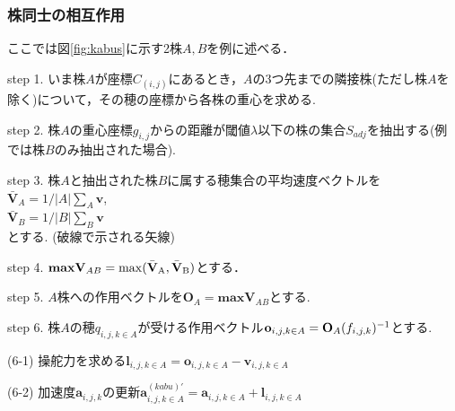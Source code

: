 \documentclass[twocolumn]{jarticle}
\begin{document}
    \subsubsection{株同士の相互作用}
    ここでは図\ref{fig:kabus}に示す2株$A,B$を例に述べる．
    \begin{description}
        \item{step 1.} いま株$A$が座標$C_(i,j)$にあるとき，$A$の3つ先までの隣接株(ただし株$A$を除く)について，その穂の座標から各株の重心を求める.
        \item{step 2.} 株$A$の重心座標$g_{i,j}$からの距離が閾値$\lambda$以下の株の集合$S_{adj}$を抽出する(例では株$B$のみ抽出された場合).
        \item{step 3.} 株$A$と抽出された株$B$に属する穂集合の平均速度ベクトルを\\
        $\displaystyle \bar{\mathbf{V}}_{A}=1/|A|{\sum_{A} \mathbf{v}}$,\\
        $\displaystyle \bar{\mathbf{V}}_{B}=1/|B|{\sum_{B} \mathbf{v}}$\\
        とする. (破線で示される矢線)
        \item{step 4.} $\displaystyle\mathbf{maxV}_{AB}=\rm{max}(\bar{\mathbf{V}}_{A},\bar{\mathbf{V}}_{B})$とする．
        \item{step 5.} $A$株への作用ベクトルを$\displaystyle\mathbf{O}_{A}=\mathbf{maxV}_{AB}$とする. 
        \item{step 6.} 株$A$の穂$q_{i,j,k \in A}$が受ける作用ベクトル$\mathbf{o}_{i,j,k \in A} \\
        =\mathbf{O}_{A}(f_{i,j,k})^{-1}$とする.
        \begin{description}
            \item{(6-1)} 操舵力を求める$\mathbf{l}_{i,j,k\in A}=\mathbf{o}_{i,j,k \in A}-\mathbf{v}_{i,j,k \in A}$
            \item{(6-2)} 加速度$\mathbf{a}_{i,j,k}$の更新$\mathbf{a}^{(kabu)\prime}_{i,j,k \in A}=\mathbf{a}_{i,j,k \in A}+\mathbf{l}_{i,j,k \in A}$
        \end{description}
    \end{description}
\end{document}
